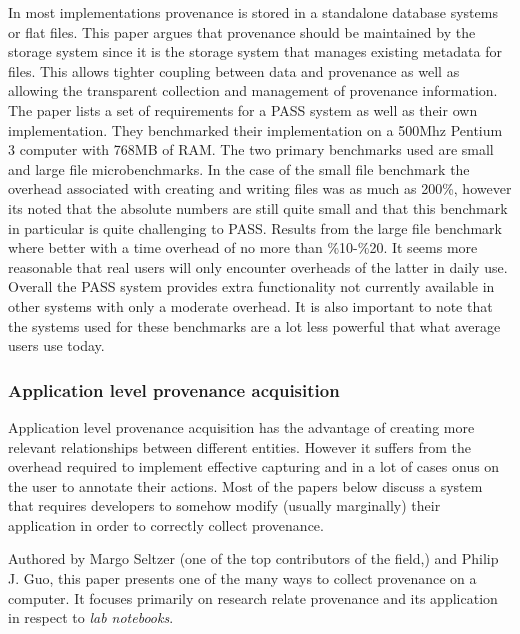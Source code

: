 In most implementations provenance is stored in a standalone database systems or flat files. This paper argues that provenance should be maintained by the storage system since it is the storage system that manages existing metadata for files. This allows tighter coupling between data and provenance as well as allowing the transparent collection and management of provenance information. The paper lists a set of requirements for a PASS system as well as their own implementation. They benchmarked their implementation on a 500Mhz Pentium 3 computer with 768MB of RAM. The two primary benchmarks used are small and large file microbenchmarks. In the case of the small file benchmark the overhead associated with creating and writing files was as much as 200\%, however its noted that the absolute numbers are still quite small and that this benchmark in particular is quite challenging to PASS. Results from the large file benchmark where better with a time overhead of no more than \%10-\%20.  It seems more reasonable that real users will only encounter overheads of the latter in daily use. Overall the PASS system provides extra functionality not currently available in other systems with only a moderate overhead. It is also important to note that the systems used for these benchmarks are a lot less powerful that what average users use today.

\subsubsection{Application level provenance acquisition}
\label{sub:application_level_provenance_acquisition}

Application level provenance acquisition has the advantage of creating more relevant relationships between different entities. However it suffers from the overhead required to implement effective capturing and in a lot of cases onus on the user to annotate their actions. Most of the papers below discuss a system that requires developers to somehow modify (usually marginally) their application in order to correctly collect provenance.


Authored by Margo Seltzer (one of the top contributors of the field\cite{Macko2012,Seltzer2011,Borkin2013,Muniswamy-Reddy2010,Braun2008},) and Philip J. Guo, this paper presents one of the many ways to collect provenance on a computer. It focuses primarily on research relate provenance and its application in respect to \textit{lab notebooks}.

